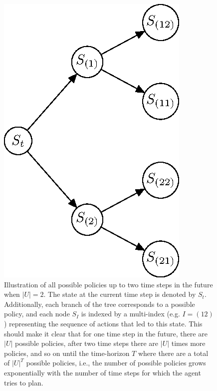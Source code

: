 \documentclass[twoside,11pt]{article}
\begin{document}
\begin{figure}[H]
	\begin{center}
	\includegraphics[scale=0.8]{BTAI-figure3}
	\end{center}
    \caption{Illustration of all possible policies up to two time steps in the future when $|U| = 2$. The state at the current time step is denoted by $S_t$. Additionally, each branch of the tree corresponds to a possible policy, and each node $S_I$ is indexed by a multi-index (e.g. $I=(12)$) representing the sequence of actions that led to this state. This should make it clear that for one time step in the future, there are $|U|$ possible policies, after two time steps there are $|U|$ times more policies, and so on until the time-horizon $T$ where there are a total of $|U|^T$ possible policies, i.e., the number of possible policies grows exponentially with the number of time steps for which the agent tries to plan.}
    \label{fig:exp_class_illustration}
\end{figure}
\end{document}
